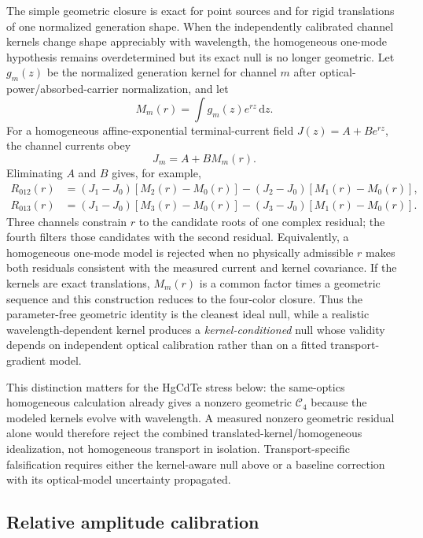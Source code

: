 \documentclass[11pt]{article}
\newcommand{\Cfour}{\mathcal{C}_4}
\newcommand{\dd}{\mathrm{d}}
\begin{document}
The simple geometric closure is exact for point sources and for rigid translations of one normalized generation shape. When the independently calibrated channel kernels change shape appreciably with wavelength, the homogeneous one-mode hypothesis remains overdetermined but its exact null is no longer geometric. Let $g_m(z)$ be the normalized generation kernel for channel $m$ after optical-power/absorbed-carrier normalization, and let
\begin{equation}
M_m(r)=\int g_m(z)e^{rz}\,\dd z.
\label{eq:kernel_moment}
\end{equation}
For a homogeneous affine-exponential terminal-current field $J(z)=A+Be^{rz}$, the channel currents obey
\begin{equation}
\boxed{J_m=A+B M_m(r).}
\label{eq:kernel_aware_model}
\end{equation}
Eliminating $A$ and $B$ gives, for example,
\begin{align}
R_{012}(r)&=(J_1-J_0)[M_2(r)-M_0(r)]-(J_2-J_0)[M_1(r)-M_0(r)],\\
R_{013}(r)&=(J_1-J_0)[M_3(r)-M_0(r)]-(J_3-J_0)[M_1(r)-M_0(r)].
\end{align}
Three channels constrain $r$ to the candidate roots of one complex residual; the fourth filters those candidates with the second residual. Equivalently, a homogeneous one-mode model is rejected when no physically admissible $r$ makes both residuals consistent with the measured current and kernel covariance. If the kernels are exact translations, $M_m(r)$ is a common factor times a geometric sequence and this construction reduces to the four-color closure. Thus the parameter-free geometric identity is the cleanest ideal null, while a realistic wavelength-dependent kernel produces a \emph{kernel-conditioned} null whose validity depends on independent optical calibration rather than on a fitted transport-gradient model.

This distinction matters for the HgCdTe stress below: the same-optics homogeneous calculation already gives a nonzero geometric $\Cfour$ because the modeled kernels evolve with wavelength. A measured nonzero geometric residual alone would therefore reject the combined translated-kernel/homogeneous idealization, not homogeneous transport in isolation. Transport-specific falsification requires either the kernel-aware null above or a baseline correction with its optical-model uncertainty propagated.

\subsection{Relative amplitude calibration}
\end{document}
